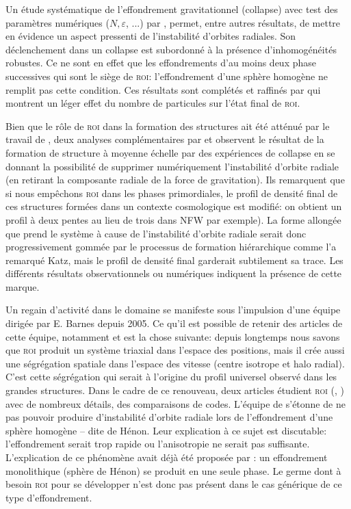 Un étude systématique de l'effondrement gravitationnel (collapse) avec test des paramètres numériques ($N,\varepsilon$, ...) par
\cite{roy}, permet, entre autres résultats, de mettre en évidence un aspect pressenti de l'instabilité d'orbites radiales. Son déclenchement dans un
collapse est subordonné à la présence d'inhomogénéités robustes. Ce ne sont en effet que les effondrements d'au moins deux phase successives qui sont le
siège de \textsc{roi}: l'effondrement d'une sphère homogène ne remplit pas cette condition. Ces résultats sont complétés et raffinés par
\cite{boily} qui montrent un léger effet du nombre de particules sur l'état final de \textsc{roi}.

Bien que le rôle de \textsc{roi} dans la formation des structures ait été atténué par le travail de \cite{katz}, deux analyses
complémentaires par \cite{huss} et \cite{macmillan} observent le résultat de la formation de structure à moyenne
échelle par des expériences de collapse en se donnant la possibilité de supprimer numériquement l'instabilité d'orbite radiale (en retirant la
composante radiale de la force de gravitation). Ils remarquent que si nous empêchons \textsc{roi} dans les phases primordiales, le profil
de densité final de ces structures formées dans un contexte cosmologique est modifié: on obtient un profil à deux pentes au lieu de trois dans NFW par exemple).
La forme allongée que prend le système à cause de l'instabilité d'orbite radiale serait donc progressivement gommée par le processus de formation
hiérarchique comme l'a remarqué Katz, mais le profil de densité final garderait subtilement sa trace. Les différents résultats observationnels ou
numériques indiquent la présence de cette marque.

Un regain d'activité dans le domaine se manifeste sous l'impulsion d'une équipe dirigée par E. Barnes depuis 2005. Ce qu'il est possible de retenir des
articles de cette équipe, notamment \cite{barnes2005} et \cite{ROI_Moderne} est la chose suivante: depuis longtemps nous savons que \textsc{roi} produit
un système triaxial dans l'espace des positions, mais il crée aussi une ségrégation spatiale dans l'espace des vitesse (centre isotrope et halo
radial). C'est cette ségrégation qui serait à l'origine du profil universel observé dans les grandes structures. Dans le cadre de ce
renouveau, deux articles étudient \textsc{roi} (\cite{barneslanzel}, \cite{trenti}) avec de nombreux détails, des
comparaisons de codes. L'équipe de \cite{trenti} s'étonne de ne pas pouvoir produire d'instabilité d'orbite radiale lors de
l'effondrement d'une sphère homogène -- dite de Hénon. Leur explication à ce sujet est discutable: l'effondrement serait trop rapide ou l'anisotropie
ne serait pas suffisante. L'explication de ce phénomène avait déjà été proposée par \cite{roy}: un effondrement monolithique
(sphère de Hénon) se produit en une seule phase. Le germe dont à besoin \textsc{roi} pour se développer n'est donc pas présent dans le cas générique
de ce type d'effondrement.

